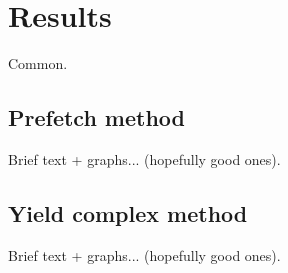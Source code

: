 \chapter{Results}
Common.

\section{Prefetch method}
Brief text + graphs... (hopefully good ones).

\section{Yield complex method}
Brief text + graphs... (hopefully good ones).